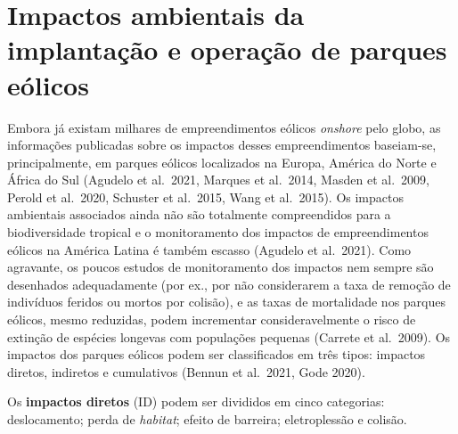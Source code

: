 \documentclass[
  oneside]{scrbook}
\begin{document}
\hypertarget{impactos-ambientais-da-implantauxe7uxe3o-e-operauxe7uxe3o-de-parques-euxf3licos}{%
\section{Impactos ambientais da implantação e operação de parques eólicos}\label{impactos-ambientais-da-implantauxe7uxe3o-e-operauxe7uxe3o-de-parques-euxf3licos}}

Embora já existam milhares de empreendimentos eólicos \emph{onshore} pelo globo, as informações publicadas sobre os impactos desses empreendimentos baseiam-se, principalmente, em parques eólicos localizados na Europa, América do Norte e África do Sul (Agudelo et al.~2021, Marques et al.~2014, Masden et al.~2009, Perold et al.~2020, Schuster et al.~2015, Wang et al.~2015). Os impactos ambientais associados ainda não são totalmente compreendidos para a biodiversidade tropical e o monitoramento dos impactos de empreendimentos eólicos na América Latina é também escasso (Agudelo et al.~2021). Como agravante, os poucos estudos de monitoramento dos impactos nem sempre são desenhados adequadamente (por ex., por não considerarem a taxa de remoção de indivíduos feridos ou mortos por colisão), e as taxas de mortalidade nos parques eólicos, mesmo reduzidas, podem incrementar consideravelmente o risco de extinção de espécies longevas com populações pequenas (Carrete et al.~2009). Os impactos dos parques eólicos podem ser classificados em três tipos: impactos diretos, indiretos e cumulativos (Bennun et al.~2021, Gode 2020).

Os \textbf{impactos diretos} (ID) podem ser divididos em cinco categorias: deslocamento; perda de \emph{habitat}; efeito de barreira; eletroplessão e colisão.
\end{document}
